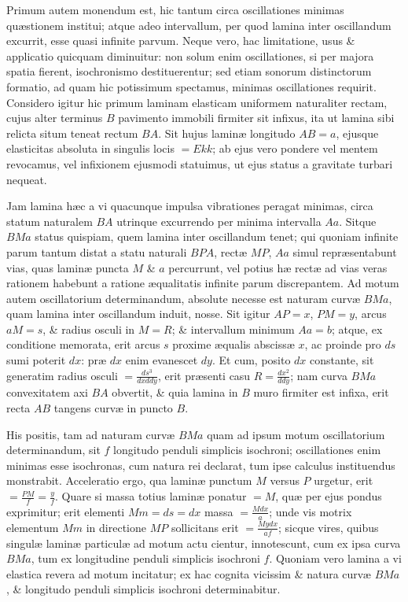 Primum autem monendum est, hic tantum circa oscillationes minimas quæstionem institui; atque adeo intervallum, per quod lamina inter oscillandum excurrit, esse quasi infinite parvum. Neque vero, hac limitatione, usus \& applicatio quicquam diminuitur: non solum enim oscillationes, si per majora spatia fierent, isochronismo destituerentur; sed etiam sonorum distinctorum formatio, ad quam hic potissimum spectamus, minimas oscillationes requirit. Considero igitur hic primum laminam elasticam uniformem naturaliter rectam, cujus alter terminus $B$ pavimento immobili firmiter sit infixus, ita ut lamina sibi relicta situm teneat rectum $BA$. Sit hujus laminæ longitudo $AB=a$, ejusque elasticitas absoluta in singulis locis $=Ekk$; ab ejus vero pondere vel mentem revocamus, vel infixionem ejusmodi statuimus, ut ejus status a gravitate turbari nequeat.

Jam lamina hæc a vi quacunque impulsa vibrationes peragat minimas, circa statum naturalem $BA$ utrinque excurrendo per minima intervalla $Aa$. Sitque $BMa$ status quispiam, quem lamina inter oscillandum tenet; qui quoniam infinite parum tantum distat a statu naturali $BPA$, rectæ $MP$, $Aa$ simul repræsentabunt vias, quas laminæ puncta $M$ \& $a$ percurrunt, vel potius hæ rectæ ad vias veras rationem habebunt a ratione æqualitatis infinite parum discrepantem. Ad motum autem oscillatorium determinandum, absolute necesse est naturam curvæ $BMa$, quam lamina inter oscillandum induit, nosse. Sit igitur $AP=x$, $PM=y$, arcus $aM=s$, \& radius osculi in $M=R$; \& intervallum minimum $Aa=b$; atque, ex conditione memorata, erit arcus $s$ proxime æqualis abscissæ $x$, ac proinde pro $ds$ sumi poterit $dx$: præ $dx$ enim evanescet $dy$. Et cum, posito $dx$ constante, sit generatim radius osculi $=\frac{ds^3}{dxddy}$, erit præsenti casu $R=\frac{dx^2}{ddy}$; nam curva $BMa$ convexitatem axi $BA$ obvertit, \& quia lamina in $B$ muro firmiter est infixa, erit recta $AB$ tangens curvæ in puncto $B$.

His positis, tam ad naturam curvæ $BMa$ quam ad ipsum motum oscillatorium determinandum, sit $f$ longitudo penduli simplicis isochroni; oscillationes enim minimas esse isochronas, cum natura rei declarat, tum ipse calculus instituendus monstrabit. Acceleratio ergo, qua laminæ punctum $M$ versus $P$ urgetur, erit $=\frac{PM}f=\frac yf$. Quare si massa totius laminæ ponatur $=M$, quæ per ejus pondus exprimitur; erit elementi $Mm=ds=dx$ massa $=\frac{Mdx}a$; unde vis motrix elementum $Mm$ in directione $MP$ sollicitans erit $=\frac{Mydx}{af}$; sicque vires, quibus singulæ laminæ particulæ ad motum actu cientur, innotescunt, cum ex ipsa curva $BMa$, tum ex longitudine penduli simplicis isochroni $f$. Quoniam vero lamina a vi elastica revera ad motum incitatur; ex hac cognita vicissim \& natura curvæ $BMa$, \& longitudo penduli simplicis isochroni determinabitur.

